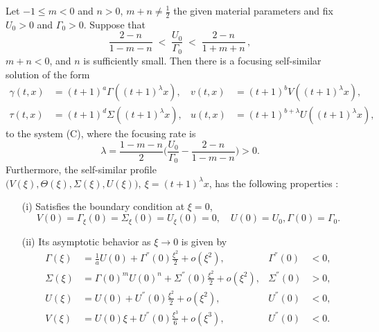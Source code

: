 \documentclass[graybox]{svmult}
\begin{document}
\begin{theorem} \label{thm2}
Let $-1\le m<0$ and $n>0$, $m+n\ne \frac{1}{2}$ the given material parameters and fix $U_0>0$ and $\Gamma_0>0$. Suppose that
\begin{equation*}
 \frac{2-n}{1-m-n} \;<\; \frac{U_0}{\Gamma_0} \;<\; \frac{2-n}{1+m+n} \, ,
\end{equation*}
$m+n<0$, and $n$ is sufficiently small. Then there is a focusing self-similar solution of the form
\begin{equation*}
\begin{aligned}
 \gamma(t,x) &= (t+1)^a\Gamma((t+1)^\lambda x), & v(t,x) &= (t+1)^b V((t+1)^\lambda x), \\
 \tau(t,x) &= (t+1)^d \Sigma((t+1)^\lambda x), & u(t,x) &= (t+1)^{b+\lambda} U((t+1)^\lambda x),
\end{aligned}
\end{equation*}
to the system (C), where the focusing rate is
\begin{equation}
 \lambda = \frac{1-m-n}{2}\Big(\frac{U_0}{\Gamma_0} - \frac{2-n}{1-m-n}\Big)>0. \label{eq:lambdaC}
\end{equation}
Furthermore, the self-similar profile $\big(V(\xi),\Theta(\xi),\Sigma(\xi),U(\xi)\big), \ \xi = (t+1)^\lambda x$,  has the  following properties :
 \begin{enumerate}
  \item[(i)] Satisfies the boundary condition at $\xi=0$,
    \begin{equation*}
    {V}(0) = \Gamma_\xi(0) = \Sigma_\xi(0) = {U}_\xi(0)=0, \quad U(0)=U_0, \Gamma(0)=\Gamma_0.
  \end{equation*}
  \item[(ii)] Its asymptotic behavior as $\xi \rightarrow 0$ is given by 
  \begin{equation} \label{eq:ss_asympC0}
  \begin{aligned}
    \Gamma(\xi) &= \frac{1}{a}U(0) + \Gamma^{''}(0)\frac{\xi^2}{2} + o(\xi^2), & \Gamma^{''}(0)&<0,\\
    \Sigma(\xi) &= \Gamma(0)^{m}{U(0)^n}+ \Sigma^{''}(0)\frac{\xi^2}{2} + o(\xi^2), & \Sigma^{''}(0)&>0, \\
    U(\xi) &= U(0) + U^{''}(0)\frac{\xi^2}{2} + o(\xi^2), & U^{''}(0)&<0,\\
    V(\xi) &= U(0)\xi + U^{''}(0)\frac{\xi^3}{6} + o(\xi^3), & U^{''}(0)&<0.
  \end{aligned}

\end{equation}
\end{enumerate}
\end{theorem}
\end{document}
